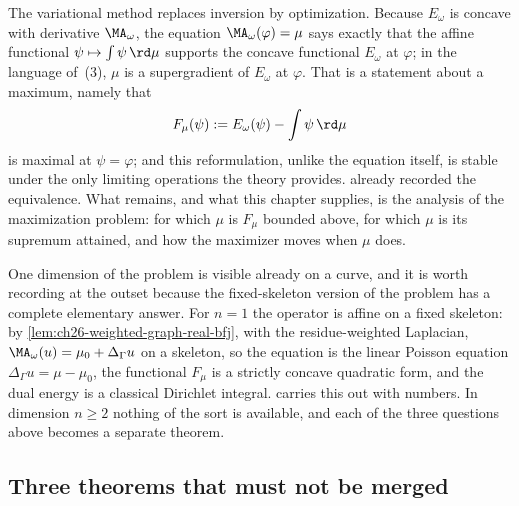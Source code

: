 The variational method replaces inversion by optimization.  Because
\(E_\omega\) is concave with derivative \(\MA_\omega\), the equation
\(\MA_\omega(\varphi)=\mu\) says exactly that the affine functional
\(\psi\mapsto\int\psi\,\rd\mu\) supports the concave functional
\(E_\omega\) at \(\varphi\); in the language of
\,(3), \(\mu\) is a supergradient of
\(E_\omega\) at \(\varphi\).  That is a statement about a maximum, namely
that
\[
 F_\mu(\psi):=E_\omega(\psi)-\int\psi\,\rd\mu
\]
is maximal at \(\psi=\varphi\); and this reformulation, unlike the equation
itself, is stable under the only limiting operations the theory provides.
 already recorded the
equivalence.  What remains, and what this chapter supplies, is the analysis
of the maximization problem: for which \(\mu\) is \(F_\mu\) bounded above,
for which \(\mu\) is its supremum attained, and how the maximizer moves when
\(\mu\) does.

One dimension of the problem is visible already on a curve, and it is worth
recording at the outset because the fixed-skeleton version of the problem
has a complete elementary answer.  For \(n=1\) the operator
is affine on a fixed skeleton: by
\cref{lem:ch26-weighted-graph-real-bfj}, with the residue-weighted Laplacian,
\(\MA_\omega(u)=\mu_0+\Delta_\Gamma u\) on a skeleton, so the equation is
the linear Poisson equation \(\Delta_\Gamma u=\mu-\mu_0\), the functional
\(F_\mu\) is a strictly concave quadratic form, and the dual energy is a
classical Dirichlet integral.   carries this out with
numbers.  In dimension \(n\geq2\) nothing of the sort is available, and each
of the three questions above becomes a separate theorem.

\subsection{Three theorems that must not be merged}
\label{sec:ch28-three}

